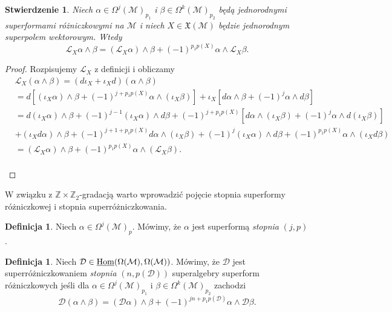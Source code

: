 \documentclass[11pt,a4paper]{report}
\newtheorem{proposition}[theorem]{Stwierdzenie}
\theoremstyle{definition}
\newtheorem{definition}[theorem]{Definicja}
\begin{document}
\begin{proposition}
\label{prop:superlie}
Niech $\alpha \in \Omega^j (\mathcal{M})_{p_1}\!$ i $\beta\in \Omega^k (\mathcal{M})_{p_2}$ będą jednorodnymi superformami różniczkowymi na $\mathcal{M}$ i niech $X \in \mathfrak{X}(\mathcal{M})$ będzie jednorodnym superpolem wektorowym. Wtedy
\begin{equation*}
\mathcal{L}_X\alpha\wedge\beta=(\mathcal{L}_X\alpha)\wedge\beta+(-1)^{p_1 p(X)} \alpha\wedge\mathcal{L}_X\beta.
\end{equation*}
\end{proposition}

\begin{proof}
Rozpisujemy $\mathcal L_X$ z definicji i obliczamy
\begin{equation*}
\begin{aligned}
&\mathcal{L}_X (\alpha\wedge \beta) =(d\iota_X+\iota_Xd)(\alpha\wedge \beta)\\
&=d[(\iota_X\alpha)\wedge \beta+(-1)^{j+p_1p(X)}\alpha\wedge (\iota_X\beta)]+\iota_X[d\alpha \wedge \beta+(-1)^{j}\alpha\wedge d\beta]\\
&=d(\iota_X \alpha) \wedge \beta+(-1)^{j-1}(\iota_X\alpha)\wedge d\beta
+(-1)^{j+p_1 p(X)}[d\alpha\wedge (\iota_X\beta)+(-1)^{j}\alpha\wedge d(\iota_X\beta)] \\
&+(\iota_X d\alpha) \wedge \beta + (-1)^{j+1+p_1 p(X)} d\alpha \wedge (\iota_X\beta) +(-1)^j (\iota_X\alpha) \wedge d\beta + (-1)^{p_1 p(X)} \alpha \wedge (\iota_X d\beta) \\
&=(\mathcal{L}_X\alpha)\wedge\beta+(-1)^{p_1 p(X)}\alpha\wedge (\mathcal{L}_X\beta).
\end{aligned}
\end{equation*} \\[-27pt]
\end{proof}

W związku z $\mathbb{Z}\times \mathbb{Z}_2$-gradacją warto wprowadzić pojęcie stopnia superformy różniczkowej i stopnia superróżniczkowania.

\begin{definition}
Niech $\alpha \in \Omega^j (\mathcal{M})_{p}$. Mówimy, że $\alpha$ jest superformą \textit{stopnia} $(j,p)$.
\end{definition}

\begin{definition}
Niech $\mathcal{D} \in \underline{\rm Hom}(\Omega(\mathcal{M}),\Omega(\mathcal{M}))$. Mówimy, że $\mathcal D$ jest superróżniczkowaniem \textit{stopnia} $(n,p(\mathcal{D}))$ superalgebry superform różniczkowych jeśli dla $\alpha \in \Omega^j (\mathcal{M})_{p_1}\!$ i $\beta\in \Omega^k (\mathcal{M})_{p_2}$ zachodzi
\begin{equation*}
 \mathcal D(\alpha\wedge \beta)=(\mathcal D\alpha)\wedge \beta+(-1)^{jn+p_1 p(\mathcal D)} \alpha\wedge \mathcal D\beta.
\end{equation*}
\end{definition}
\end{document}
